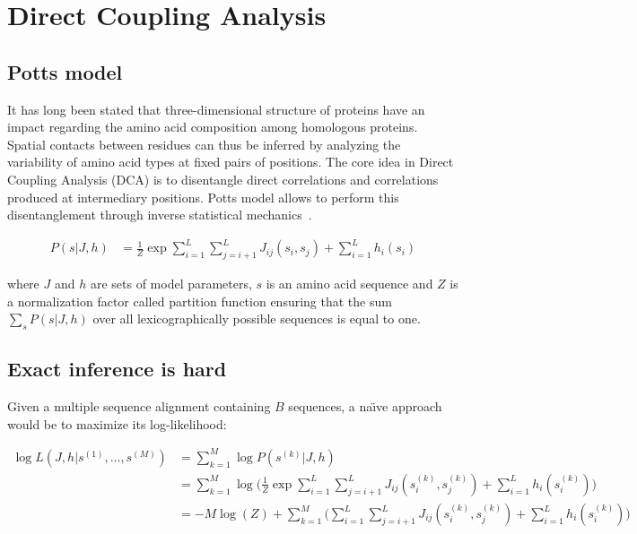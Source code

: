 \section{Direct Coupling Analysis}

    \subsection{Potts model} \label{potts}

        It has long been stated that three-dimensional structure of proteins
        have an impact regarding the amino acid composition among
        homologous proteins. Spatial contacts between residues can thus be inferred
        by analyzing the variability of amino acid types at fixed pairs of positions.
        The core idea in Direct Coupling Analysis (DCA) is to disentangle direct
        correlations and correlations produced at intermediary positions.
        Potts model allows to perform this disentanglement through inverse
        statistical mechanics~\cite{PhysRevE.87.012707}.

        \begin{equation}
            \begin{split}
                P(s \vert J, h) & = \frac{1}{Z} \exp{\sum\limits_{i=1}^L \sum\limits_{j=i+1}^L J_{ij}(s_i, s_j) + \sum\limits_{i=1}^L h_i(s_i)}
            \end{split}
        \end{equation}

        where $J$ and $h$ are sets of model parameters, $s$ is an amino acid sequence and
        $Z$ is a normalization factor called partition function ensuring
        that the sum $\sum\limits_{s} P(s \vert J, h)$ over all lexicographically
        possible sequences is equal to one.

    \subsection{Exact inference is hard}

        Given a multiple sequence alignment containing $B$ sequences, a na\"\i ve approach would be to maximize its log-likelihood:

        \begin{equation}
            \begin{split}
                \log{L}(J, h \vert s^{(1)}, \dotsc, s^{(M)}) & = \sum\limits_{k=1}^M \log P(s^{(k)} \vert J, h) \\
                & = \sum\limits_{k=1}^M \log \Bigg( \frac{1}{Z} \exp{\sum\limits_{i=1}^L 
                    \sum\limits_{j=i+1}^L J_{ij}(s_i^{(k)}, s_j^{(k)}) + \sum\limits_{i=1}^L h_i(s_i^{(k)})} \Bigg) \\
                & = -M \log(Z) + \sum\limits_{k=1}^M \Big( \sum\limits_{i=1}^L \sum\limits_{j=i+1}^L J_{ij}(s_i^{(k)}, s_j^{(k)}) 
                    + \sum\limits_{i=1}^L h_i(s_i^{(k)}) \Big)
            \end{split}
        \end{equation}

